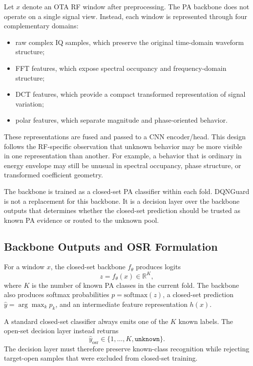 Let $x$ denote an OTA RF window after preprocessing. The PA backbone does not operate on a single signal view. Instead, each window is represented through four complementary domains:
\begin{itemize}
    \item raw complex IQ samples, which preserve the original time-domain waveform structure;
    \item FFT features, which expose spectral occupancy and frequency-domain structure;
    \item DCT features, which provide a compact transformed representation of signal variation;
    \item polar features, which separate magnitude and phase-oriented behavior.
\end{itemize}
These representations are fused and passed to a CNN encoder/head. This design follows the RF-specific observation that unknown behavior may be more visible in one representation than another. For example, a behavior that is ordinary in energy envelope may still be unusual in spectral occupancy, phase structure, or transformed coefficient geometry.

The backbone is trained as a closed-set PA classifier within each fold. DQNGuard is not a replacement for this backbone. It is a decision layer over the backbone outputs that determines whether the closed-set prediction should be trusted as known PA evidence or routed to the unknown pool.

\subsection{Backbone Outputs and OSR Formulation}
\label{subsec:osr_formulation}

For a window $x$, the closed-set backbone $f_{\theta}$ produces logits
\begin{equation}
    z = f_{\theta}(x) \in \mathbb{R}^{K},
\end{equation}
where $K$ is the number of known PA classes in the current fold. The backbone also produces softmax probabilities $p=\mathrm{softmax}(z)$, a closed-set prediction $\hat{y}=\arg\max_k p_k$, and an intermediate feature representation $h(x)$.

A standard closed-set classifier always emits one of the $K$ known labels. The open-set decision layer instead returns
\begin{equation}
    \hat{y}_{\mathrm{osr}} \in \{1,\ldots,K,\texttt{unknown}\}.
\end{equation}
The decision layer must therefore preserve known-class recognition while rejecting target-open samples that were excluded from closed-set training.

